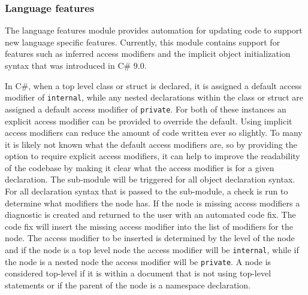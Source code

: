 \subsubsection{Language features}
The language features module provides automation for updating code to support new language specific features. Currently, this module contains support for features such as inferred access modifiers and the implicit object initialization syntax that was introduced in C\# 9.0.

In C\#, when a top level class or struct is declared, it is assigned a default access modifier of \texttt{internal}, while any nested declarations within the class or struct are assigned a default access modifier of \texttt{private}. For both of these instances an explicit access modifier can be provided to override the default. Using implicit access modifiers can reduce the amount of code written ever so slightly. To many it is likely not known what the default access modifiers are, so by providing the option to require explicit access modifiers, it can help to improve the readability of the codebase by making it clear what the access modifier is for a given declaration.
The sub-module will be triggered for all object declaration syntax. For all declaration syntax that is passed to the sub-module, a check is run to determine what modifiers the node has. If the node is missing access modifiers a diagnostic is created and returned to the user with an automated code fix. The code fix will insert the missing access modifier into the list of modifiers for the node. The access modifier to be inserted is determined by the level of the node and if the node is a top level node the access modifier will be \texttt{internal}, while if the node is a nested node the access modifier will be \texttt{private}. A node is considered top-level if it is within a document that is not using top-level statements or if the parent of the node is a namespace declaration.

